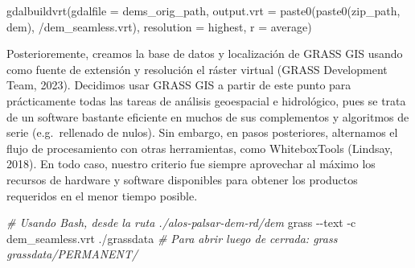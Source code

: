 \documentclass[spanish]{article}
\newenvironment{Shaded}{\begin{snugshade}}{\end{snugshade}}
\newcommand{\AttributeTok}[1]{\textcolor[rgb]{0.77,0.63,0.00}{#1}}
\newcommand{\CommentTok}[1]{\textcolor[rgb]{0.56,0.35,0.01}{\textit{#1}}}
\newcommand{\ExtensionTok}[1]{#1}
\newcommand{\FunctionTok}[1]{\textcolor[rgb]{0.00,0.00,0.00}{#1}}
\newcommand{\NormalTok}[1]{#1}
\newcommand{\StringTok}[1]{\textcolor[rgb]{0.31,0.60,0.02}{#1}}
\begin{document}
\begin{Shaded}
\begin{Highlighting}[]
\FunctionTok{gdalbuildvrt}\NormalTok{(}\AttributeTok{gdalfile =}\NormalTok{ dems\_orig\_path,}
             \AttributeTok{output.vrt =} \FunctionTok{paste0}\NormalTok{(}\FunctionTok{paste0}\NormalTok{(zip\_path, }\StringTok{\textquotesingle{}dem\textquotesingle{}}\NormalTok{), }\StringTok{\textquotesingle{}/dem\_seamless.vrt\textquotesingle{}}\NormalTok{),}
             \AttributeTok{resolution =} \StringTok{\textquotesingle{}highest\textquotesingle{}}\NormalTok{, }\AttributeTok{r =} \StringTok{\textquotesingle{}average\textquotesingle{}}\NormalTok{)}
\end{Highlighting}
\end{Shaded}

Posterioremente, creamos la base de datos y localización de GRASS GIS
usando como fuente de extensión y resolución el ráster virtual (GRASS
Development Team, 2023). Decidimos usar GRASS GIS a partir de este punto
para prácticamente todas las tareas de análisis geoespacial e
hidrológico, pues se trata de un software bastante eficiente en muchos
de sus complementos y algoritmos de serie (e.g.~rellenado de nulos). Sin
embargo, en pasos posteriores, alternamos el flujo de procesamiento con
otras herramientas, como WhiteboxTools (Lindsay, 2018). En todo caso,
nuestro criterio fue siempre aprovechar al máximo los recursos de
hardware y software disponibles para obtener los productos requeridos en
el menor tiempo posible.

\begin{Shaded}
\begin{Highlighting}[]
\CommentTok{\# Usando Bash, desde la ruta ./alos{-}palsar{-}dem{-}rd/dem}
\ExtensionTok{grass} \AttributeTok{{-}{-}text} \AttributeTok{{-}c}\NormalTok{ dem\_seamless.vrt ./grassdata}
\CommentTok{\# Para abrir luego de cerrada: grass grassdata/PERMANENT/}
\end{Highlighting}
\end{Shaded}
\end{document}
